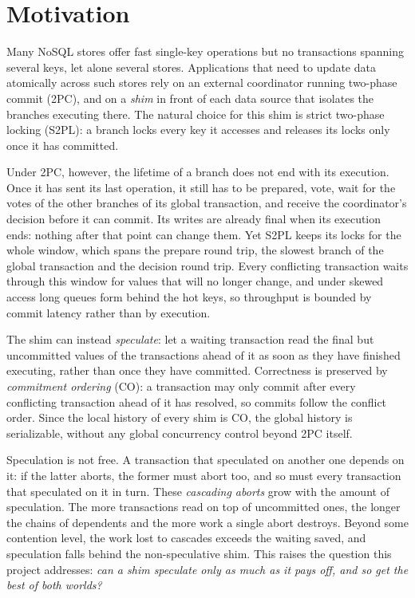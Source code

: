 \section{Motivation}
\label{sec:motivation}

Many NoSQL stores offer fast single-key operations but no transactions spanning several keys, let
alone several stores. Applications that need to update data atomically across such stores rely on
an external coordinator running two-phase commit (2PC), and on a \emph{shim} in front of each data
source that isolates the branches executing there. The natural choice for this shim is strict
two-phase locking (S2PL): a branch locks every key it accesses and releases its locks only once
it has committed.

Under 2PC, however, the lifetime of a branch does not end with its execution. Once it has sent its
last operation, it still has to be prepared, vote, wait for the votes of the other branches of its
global transaction, and receive the coordinator's decision before it can commit. Its writes are
already final when its execution ends: nothing after that point can change them. Yet S2PL keeps its
locks for the whole window, which spans the prepare round trip, the slowest branch of the global
transaction and the decision round trip. Every conflicting transaction waits through this window
for values that will no longer change, and under skewed access long queues form behind the hot
keys, so throughput is bounded by commit latency rather than by execution.

The shim can instead \emph{speculate}: let a waiting transaction read the final but uncommitted
values of the transactions ahead of it as soon as they have finished executing, rather than once
they have committed. Correctness is preserved by \emph{commitment ordering} (CO): a transaction may
only commit after every conflicting transaction ahead of it has resolved, so commits follow the
conflict order. Since the local history of every shim is CO, the global history is serializable,
without any global concurrency control beyond 2PC itself.

Speculation is not free. A transaction that speculated on another one depends on it: if the latter
aborts, the former must abort too, and so must every transaction that speculated on it in turn.
These \emph{cascading aborts} grow with the amount of speculation. The more transactions read on top
of uncommitted ones, the longer the chains of dependents and the more work a single abort destroys.
Beyond some contention level, the work lost to cascades exceeds the waiting saved, and speculation
falls behind the non-speculative shim. This raises the question this project addresses:
\emph{can a shim speculate only as much as it pays off, and so get the best of both worlds?}

